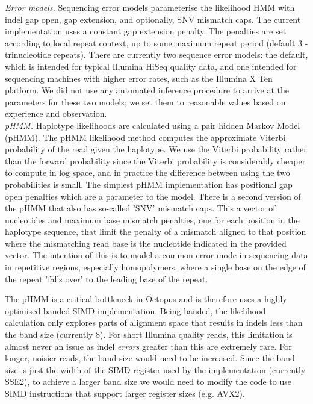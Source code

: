 \documentclass[notitlepage, twocolumn]{article}
\begin{document}
\emph{Error models.} Sequencing error models parameterise the likelihood HMM with indel gap open, gap extension, and optionally, SNV mismatch caps. The current implementation uses a constant gap extension penalty. The penalties are set according to local repeat context, up to some maximum repeat period (default 3 - trinucleotide repeats). There are currently two sequence error models: the default, which is intended for typical Illumina HiSeq quality data, and one intended for sequencing machines with higher error rates, such as the Illumina X Ten platform. We did not use any automated inference procedure to arrive at the parameters for these two models; we set them to reasonable values based on experience and observation.\\

\emph{pHMM.} Haplotype likelihoods are calculated using a pair hidden Markov Model (pHMM). The pHMM likelihood method computes the approximate Viterbi probability of the read given the haplotype. We use the Viterbi probability rather than the forward probability since the Viterbi probability is considerably cheaper to compute in log space, and in practice the difference between using the two probabilities is small. The simplest pHMM implementation has positional gap open penalties which are a parameter to the model. There is a second version of the pHMM that also has so-called 'SNV' mismatch caps. This a vector of nucleotides and maximum base mismatch penalties, one for each position in the haplotype sequence, that limit the penalty of a mismatch aligned to that position where the mismatching read base is the nucleotide indicated in the provided vector. The intention of this is to model a common error mode in sequencing data in repetitive regions, especially homopolymers, where a single base on the edge of the repeat 'falls over' to the leading base of the repeat.

The pHMM is a critical bottleneck in Octopus and is therefore uses a highly optimised banded SIMD implementation. Being banded, the likelihood calculation only explores parts of alignment space that results in indels less than the band size (currently 8). For short Illumina quality reads, this limitation is almost never an issue as indel \emph{errors} greater than this are extremely rare. For longer, noisier reads, the band size would need to be increased. Since the band size is just the width of the SIMD register used by the implementation (currently SSE2), to achieve a larger band size we would need to modify the code to use SIMD instructions that support larger register sizes (e.g. AVX2).\\
\end{document}
